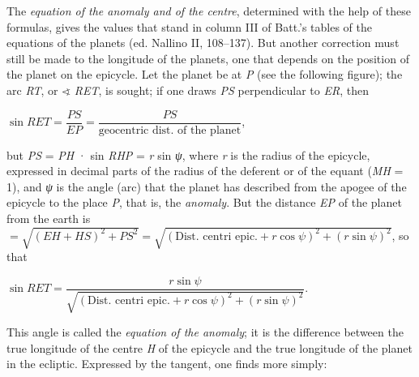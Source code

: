 \documentclass[11pt]{article}
\begin{document}
\par The \emph{equation of the anomaly and of the centre}, determined with the help of these formulas, gives the values that stand in column III of Batt.'s tables of the equations of the planets (ed. Nallino II, 108–137). But another correction must still be made to the longitude of the planets, one that depends on the position of the planet on the epicycle. Let the planet be at \emph{P} (see the following figure); the arc \emph{RT}, or {\SignFont\upshape ∢} \emph{RET}, is sought; if one draws \emph{PS} perpendicular to \emph{ER}, then\par
\par\begin{center}$\sin RET = \dfrac{PS}{EP} = \dfrac{PS}{\text{geocentric dist. of the planet}}$,\end{center}
\par but \emph{PS} = \emph{PH} · sin \emph{RHP} = \emph{r} sin \emph{{\greekfont ψ}}, where \emph{r} is the radius of the epicycle, expressed in decimal parts of the radius of the deferent or of the equant (\emph{MH} = 1), and \emph{{\greekfont ψ}} is the angle (arc) that the planet has described from the apogee of the epicycle to the place \emph{P}, that is, the \emph{anomaly}. But the distance \emph{EP} of the planet from the earth is $=\sqrt{(EH+HS)^{2}+PS^{2}} = \sqrt{(\text{Dist. centri epic.}+r\cos\psi)^{2}+(r\sin\psi)^{2}}$, so that\par
\par\begin{center}$\sin RET = \dfrac{r\sin\psi}{\sqrt{(\text{Dist. centri epic.}+r\cos\psi)^{2}+(r\sin\psi)^{2}}}$.\end{center}
\par This angle is called the \emph{equation of the anomaly}; it is the difference between the true longitude of the centre \emph{H} of the epicycle and the true longitude of the planet in the ecliptic. Expressed by the tangent, one finds more simply:\par
\end{document}
